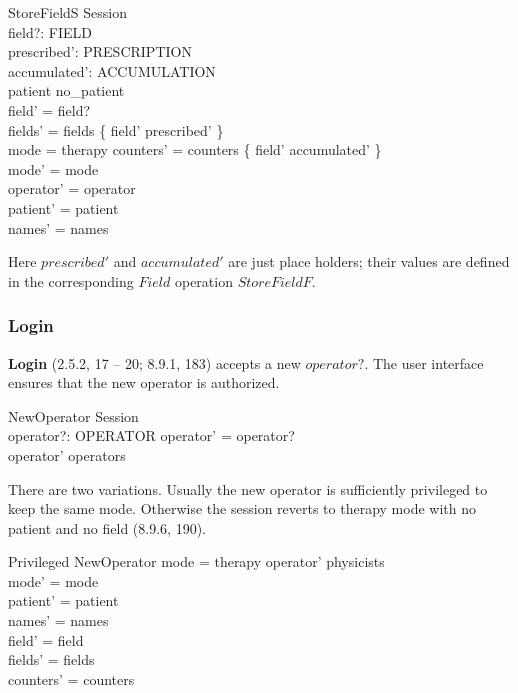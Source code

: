 \documentclass{article}
\begin{document}
\begin{schema}{StoreFieldS}
	\Delta Session \\
	field?: FIELD \\
	prescribed': PRESCRIPTION \\
	accumulated': ACCUMULATION \\
\where
	patient \neq no\_patient \\
	field' = field? \\
	fields' = fields \cup \{ field' \mapsto prescribed' \} \\
	mode = therapy \implies counters' = counters \cup \{ field' \mapsto accumulated' \} \\
\also
	mode' = mode \\
	operator' = operator \\
	patient' = patient \\
	names' = names \\
\end{schema}
Here $prescribed'$ and $accumulated'$ are just place holders; their
values are defined in the corresponding $Field$ operation
$StoreFieldF$.

\subsubsection{Login} \label{sect:login-session}

{\bf Login} (2.5.2, 17 -- 20; 8.9.1, 183) accepts a new $operator?$.
The user interface ensures that the new operator is authorized.

\begin{schema}{NewOperator}
	\Delta Session \\
	operator?: OPERATOR
\where
	operator' = operator? \\
	operator' \in operators
\end{schema}
There are two variations.  Usually the new operator is sufficiently
privileged to keep the same mode.  Otherwise the session reverts to
therapy mode with no patient and no field (8.9.6, 190).

\begin{schema}{Privileged}
	NewOperator
\where
	mode = therapy \lor operator' \in physicists \\
\also
	mode' = mode \\
	patient' = patient \\
	names' = names \\
	field' = field \\
	fields' = fields \\
	counters' = counters 
\end{schema}
\end{document}
